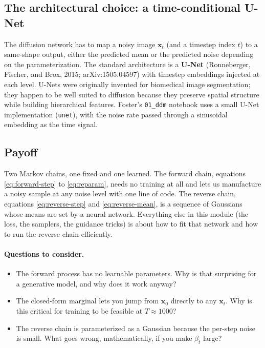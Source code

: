 \documentclass[11pt]{article}
\theoremstyle{remark}
\begin{document}
\subsection{The architectural choice: a time-conditional U-Net}

The diffusion network has to map a noisy image $\mathbf{x}_t$ (and a timestep index $t$) to a same-shape output, either the predicted mean or the predicted noise depending on the parameterization. The standard architecture is a \textbf{U-Net} (Ronneberger, Fischer, and Brox, 2015; arXiv:1505.04597) with timestep embeddings injected at each level. U-Nets were originally invented for biomedical image segmentation; they happen to be well suited to diffusion because they preserve spatial structure while building hierarchical features. Foster's \texttt{01\_ddm} notebook uses a small U-Net implementation (\texttt{unet}), with the noise rate passed through a sinusoidal embedding as the time signal.

\subsection{Payoff}

Two Markov chains, one fixed and one learned. The forward chain, equations \eqref{eq:forward-step} to \eqref{eq:reparam}, needs no training at all and lets us manufacture a noisy sample at any noise level with one line of code. The reverse chain, equations \eqref{eq:reverse-step} and \eqref{eq:reverse-mean}, is a sequence of Gaussians whose means are set by a neural network. Everything else in this module (the loss, the samplers, the guidance tricks) is about how to fit that network and how to run the reverse chain efficiently.

\paragraph{Questions to consider.}
\begin{itemize}[leftmargin=1.5em]
\item The forward process has no learnable parameters. Why is that surprising for a generative model, and why does it work anyway?
\item The closed-form marginal lets you jump from $\mathbf{x}_0$ directly to any $\mathbf{x}_t$. Why is this critical for training to be feasible at $T \approx 1000$?
\item The reverse chain is parameterized as a Gaussian because the per-step noise is small. What goes wrong, mathematically, if you make $\beta_t$ large?
\end{itemize}
\end{document}

